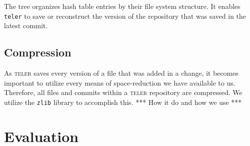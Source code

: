 \documentclass[12pt, letterpaper]{article}
\begin{document}
The tree organizes hash table entries by their file system structure. It enables
\texttt{teler} to save or reconstruct the version of the repository that was
saved in the latest commit.

\subsection{Compression}
\label{subsec:compression}

As \textsc{teler} saves every version of a file that was added in a change, it
becomes important to utilize every means of space-reduction we have available to
us. Therefore, all files and commits within a \textsc{teler} repository are
compressed. We utilize the \texttt{zlib} library to accomplish this. *** How it
do and how we use ***



\section{Evaluation}
\label{sec:evaluation}
\end{document}
